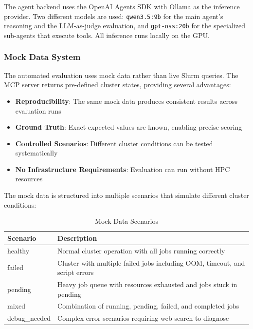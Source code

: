 The agent backend uses the OpenAI Agents SDK with Ollama as the inference provider. Two different models are used: \texttt{qwen3.5:9b} for the main agent's reasoning and the LLM-as-judge evaluation, and \texttt{gpt-oss:20b} for the specialized sub-agents that execute tools. All inference runs locally on the GPU.

\subsubsection{Mock Data System}

The automated evaluation uses mock data rather than live Slurm queries. The MCP server returns pre-defined cluster states, providing several advantages:
\begin{itemize}
    \item \textbf{Reproducibility}: The same mock data produces consistent results across evaluation runs
    \item \textbf{Ground Truth}: Exact expected values are known, enabling precise scoring
    \item \textbf{Controlled Scenarios}: Different cluster conditions can be tested systematically
    \item \textbf{No Infrastructure Requirements}: Evaluation can run without HPC resources
\end{itemize}

The mock data is structured into multiple scenarios that simulate different cluster conditions:

\begin{table}[H]
    \centering
    \caption{Mock Data Scenarios}
    \label{tab:mock-scenarios}
    \begin{tabular}{|l|p{8cm}|}
        \hline
        \textbf{Scenario} & \textbf{Description} \\
        \hline
        healthy & Normal cluster operation with all jobs running correctly \\
        failed & Cluster with multiple failed jobs including OOM, timeout, and script errors \\
        pending & Heavy job queue with resources exhausted and jobs stuck in pending \\
        mixed & Combination of running, pending, failed, and completed jobs \\
        debug\_needed & Complex error scenarios requiring web search to diagnose \\
        \hline
    \end{tabular}
\end{table}

